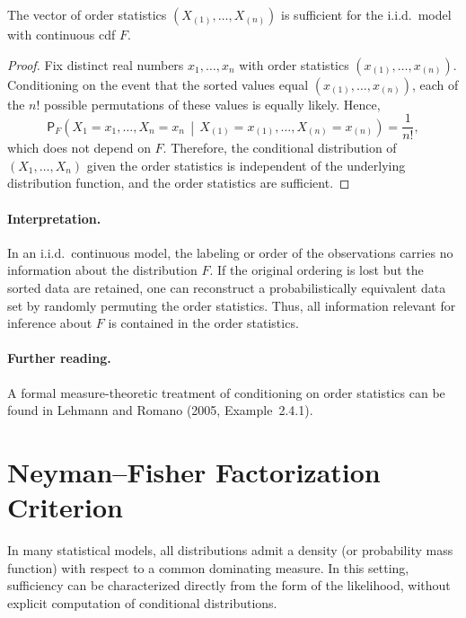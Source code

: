 \begin{claim}
The vector of order statistics $(X_{(1)},\dots,X_{(n)})$ is sufficient for the i.i.d.\ model
with continuous cdf $F$.
\end{claim}

\begin{proof}
Fix distinct real numbers $x_1,\dots,x_n$ with order statistics
$(x_{(1)},\dots,x_{(n)})$.
Conditioning on the event that the sorted values equal
$(x_{(1)},\dots,x_{(n)})$, each of the $n!$ possible permutations of these values
is equally likely.
Hence,
\[
\mathsf{P}_{F}\!\left(
X_1=x_1,\dots,X_n=x_n \,\middle|\,
X_{(1)}=x_{(1)},\dots,X_{(n)}=x_{(n)}
\right)
= \frac{1}{n!},
\]
which does not depend on $F$.
Therefore, the conditional distribution of $(X_1,\dots,X_n)$ given the order statistics
is independent of the underlying distribution function, and the order statistics are sufficient.
\end{proof}

\paragraph{Interpretation.}
In an i.i.d.\ continuous model, the labeling or order of the observations carries no information
about the distribution $F$.
If the original ordering is lost but the sorted data are retained, one can reconstruct
a probabilistically equivalent data set by randomly permuting the order statistics.
Thus, all information relevant for inference about $F$ is contained in the order statistics.

\paragraph{Further reading.}
A formal measure-theoretic treatment of conditioning on order statistics
can be found in Lehmann and Romano (2005, Example~2.4.1).

\section{Neyman--Fisher Factorization Criterion}
\label{sec:nfc}

In many statistical models, all distributions admit a density (or probability mass function)
with respect to a common dominating measure.
In this setting, sufficiency can be characterized directly from the form of the likelihood,
without explicit computation of conditional distributions.


